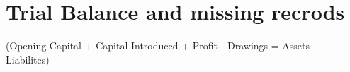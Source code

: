 \section{Trial Balance and missing recrods}

(Opening Capital + Capital Introduced + Profit - Drawings = Assets - Liabilites) 


